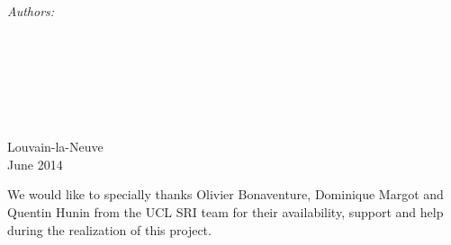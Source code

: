 \documentclass[11pt, a4paper, twoside, openright]{Packages/Thesis}
\begin{document}
\begin{titlepage}
\begin{center}
\begin{minipage}{0.4\textwidth}
\begin{center} \large
\emph{Authors:}\\
{\authornames} %
\end{center}
\end{minipage}
\\[3cm]
\\
\\
\\
\\
\\[1.5cm] %
 
{\large Louvain-la-Neuve\\ June 2014}\\[4cm] %
 
\vfill
\end{center}

\end{titlepage}

\cleardoublepage
\pagestyle{empty} %

\null\vfill %

We would like to specially thanks Olivier Bonaventure, Dominique Margot and Quentin Hunin from the UCL SRI team  for their availability, support and help during the realization of this project.


\vfill\vfill\vfill\vfill\vfill\vfill\null %

\clearpage %
\end{document}
